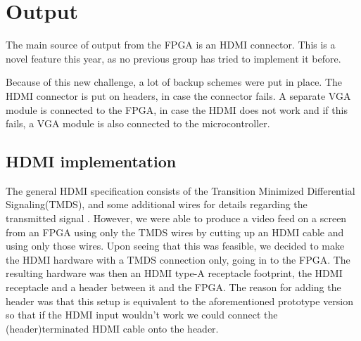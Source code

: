\documentclass[../main/report.tex]{subfiles}
\begin{document}
\section{Output}
The main source of output from the FPGA is an HDMI connector.
This is a novel feature this year, as no previous group has tried to implement it before.

Because of this new challenge, a lot of backup schemes were put in place.
The HDMI connector is put on headers, in case the connector fails.
A separate VGA module is connected to the FPGA, in case the HDMI does not work and if this fails, a VGA module is also connected to the microcontroller.

\subsection{HDMI implementation}

The general HDMI specification consists of the Transition Minimized Differential Signaling(TMDS), and some additional wires for details regarding the transmitted signal \cite{hdmi-pinout}.
However, we were able to produce a video feed on a screen from an FPGA using only the TMDS wires by cutting up an HDMI cable and using only those wires.
Upon seeing that this was feasible, we decided to make the HDMI hardware with a TMDS connection only, going in to the FPGA. The resulting hardware was then an HDMI type-A receptacle footprint, the HDMI receptacle and a header between it and the FPGA.
The reason for adding the header was that this setup is equivalent to the aforementioned prototype version so that if the HDMI input wouldn't work we could connect the (header)terminated HDMI cable onto the header.
\end{document}
